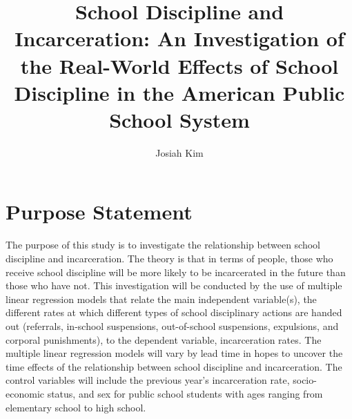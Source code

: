 \documentclass[12pt]{article}
\title{
School Discipline and Incarceration:
An Investigation of the Real-World 
Effects of School Discipline in the American Public School System 
}
\author{Josiah Kim}
\date{}
\begin{document}
 


\baselineskip24pt


\maketitle 








\section*{Purpose Statement}
The purpose of this study is to investigate the relationship between school discipline and incarceration. The theory is that in terms of people, those who receive school discipline will be more likely to be incarcerated in the future than those who have not. This investigation will be conducted by the use of multiple linear regression models that relate the main independent variable(s), the different rates at which different types of school disciplinary actions are handed out (referrals, in-school suspensions, out-of-school suspensions, expulsions, and corporal punishments), to the dependent variable, incarceration rates. The multiple linear regression models will vary by lead time in hopes to uncover the time effects of the relationship between school discipline and incarceration. The control variables will include the previous year's incarceration rate, socio-economic status, and sex for public school students with ages ranging from elementary school to high school. 
\end{document}
